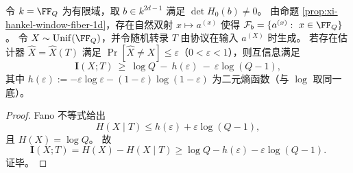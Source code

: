 \begin{theorem}[纤维内误差恢复所需的信息泄漏下界]\label{thm:xi-hankel-fiber-fano-information-leakage}
令 \(k=\FF_Q\) 为有限域，取 \(b\in k^{2d-1}\) 满足 \(\det H_0(b)\neq 0\)。
由命题 \ref{prop:xi-hankel-window-fiber-1d}，存在自然双射 \(x\mapsto a^{(x)}\) 使得
\(\mathcal F_b=\{a^{(x)}:\ x\in\FF_Q\}\)。
令 \(X\sim\mathrm{Unif}(\FF_Q)\)，并令随机转录 \(T\) 由协议在输入 \(a^{(X)}\) 时生成。
若存在估计器 \(\widehat X=\widehat X(T)\) 满足 \(\Pr[\widehat X\neq X]\le \varepsilon\)（\(0<\varepsilon<1\)），则互信息满足
\[
\mathbf I(X;T)\ \ge\ \log Q\ -\ h(\varepsilon)\ -\ \varepsilon\log(Q-1),
\]
其中 \(h(\varepsilon):=-\varepsilon\log\varepsilon-(1-\varepsilon)\log(1-\varepsilon)\) 为二元熵函数（与 \(\log\) 取同一底）。
\end{theorem}
\begin{proof}
Fano 不等式给出
\[
H(X\mid T)\le h(\varepsilon)+\varepsilon\log(Q-1),
\]
且 \(H(X)=\log Q\)。
故
\[
\mathbf I(X;T)=H(X)-H(X\mid T)\ge \log Q-h(\varepsilon)-\varepsilon\log(Q-1).
\]
证毕。
\end{proof}
